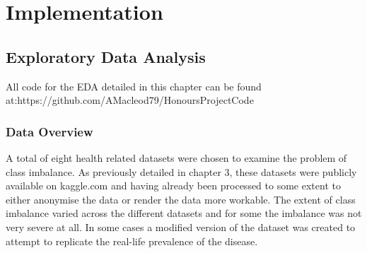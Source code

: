 \chapter{Implementation}\label{ch:Implementation}

\section{Exploratory Data Analysis}
All code for the EDA detailed in this chapter can be found at:\newline https://github.com/AMacleod79/HonoursProjectCode
\subsection{Data Overview}

A total of eight health related datasets were chosen to examine the problem of class imbalance. As previously detailed in chapter 3, these datasets were publicly available on kaggle.com and having already been processed to some extent to either anonymise the data or render the data more workable. The extent of class imbalance varied across the different datasets and for some the imbalance was not very severe at all. In some cases a modified version of the dataset was created to attempt to replicate the real-life prevalence of the disease.\newline

